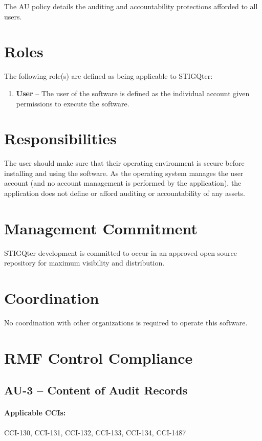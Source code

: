 \documentclass[letterpaper, 10pt, twoside]{article}
\begin{document}
The AU policy details the auditing and accountability protections afforded to all users.

\section{Roles}
\label{sec:roles}

The following role(s) are defined as being applicable to STIGQter:
\begin{enumerate}
	\item \textbf{User} -- The user of the software is defined as the individual account given permissions to execute the software.
\end{enumerate}

\section{Responsibilities}
\label{sec:responsibilities}

The user should make sure that their operating environment is secure before installing and using the software. As the operating system manages the user account (and no account management is performed by the application), the application does not define or afford auditing or accountability of any assets.

\section{Management Commitment}

STIGQter development is committed to occur in an approved open source repository for maximum visibility and distribution.

\section{Coordination}

No coordination with other organizations is required to operate this software.

\section{RMF Control Compliance}

\subsection{AU-3 -- Content of Audit Records}
\label{sec:au-3}

\paragraph{Applicable CCIs:} CCI-130, CCI-131, CCI-132, CCI-133, CCI-134, CCI-1487
\end{document}
